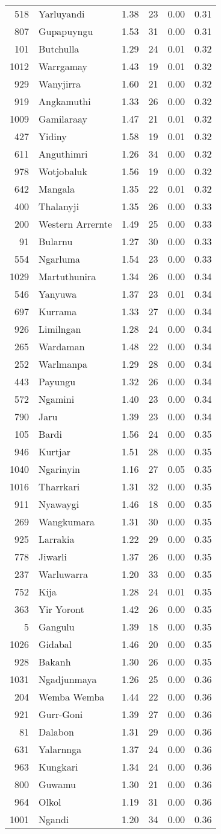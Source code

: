 \begin{longtable}[]{@{}rlrrrr@{}}
518 & Yarluyandi & 1.38 & 23 & 0.00 & 0.31\tabularnewline
807 & Gupapuyngu & 1.53 & 31 & 0.00 & 0.31\tabularnewline
101 & Butchulla & 1.29 & 24 & 0.01 & 0.32\tabularnewline
1012 & Warrgamay & 1.43 & 19 & 0.01 & 0.32\tabularnewline
929 & Wanyjirra & 1.60 & 21 & 0.00 & 0.32\tabularnewline
919 & Angkamuthi & 1.33 & 26 & 0.00 & 0.32\tabularnewline
1009 & Gamilaraay & 1.47 & 21 & 0.01 & 0.32\tabularnewline
427 & Yidiny & 1.58 & 19 & 0.01 & 0.32\tabularnewline
611 & Anguthimri & 1.26 & 34 & 0.00 & 0.32\tabularnewline
978 & Wotjobaluk & 1.56 & 19 & 0.00 & 0.32\tabularnewline
642 & Mangala & 1.35 & 22 & 0.01 & 0.32\tabularnewline
400 & Thalanyji & 1.35 & 26 & 0.00 & 0.33\tabularnewline
200 & Western Arrernte & 1.49 & 25 & 0.00 & 0.33\tabularnewline
91 & Bularnu & 1.27 & 30 & 0.00 & 0.33\tabularnewline
554 & Ngarluma & 1.54 & 23 & 0.00 & 0.33\tabularnewline
1029 & Martuthunira & 1.34 & 26 & 0.00 & 0.34\tabularnewline
546 & Yanyuwa & 1.37 & 23 & 0.01 & 0.34\tabularnewline
697 & Kurrama & 1.33 & 27 & 0.00 & 0.34\tabularnewline
926 & Limilngan & 1.28 & 24 & 0.00 & 0.34\tabularnewline
265 & Wardaman & 1.48 & 22 & 0.00 & 0.34\tabularnewline
252 & Warlmanpa & 1.29 & 28 & 0.00 & 0.34\tabularnewline
443 & Payungu & 1.32 & 26 & 0.00 & 0.34\tabularnewline
572 & Ngamini & 1.40 & 23 & 0.00 & 0.34\tabularnewline
790 & Jaru & 1.39 & 23 & 0.00 & 0.34\tabularnewline
105 & Bardi & 1.56 & 24 & 0.00 & 0.35\tabularnewline
946 & Kurtjar & 1.51 & 28 & 0.00 & 0.35\tabularnewline
1040 & Ngarinyin & 1.16 & 27 & 0.05 & 0.35\tabularnewline
1016 & Tharrkari & 1.31 & 32 & 0.00 & 0.35\tabularnewline
911 & Nyawaygi & 1.46 & 18 & 0.00 & 0.35\tabularnewline
269 & Wangkumara & 1.31 & 30 & 0.00 & 0.35\tabularnewline
925 & Larrakia & 1.22 & 29 & 0.00 & 0.35\tabularnewline
778 & Jiwarli & 1.37 & 26 & 0.00 & 0.35\tabularnewline
237 & Warluwarra & 1.20 & 33 & 0.00 & 0.35\tabularnewline
752 & Kija & 1.28 & 24 & 0.01 & 0.35\tabularnewline
363 & Yir Yoront & 1.42 & 26 & 0.00 & 0.35\tabularnewline
5 & Gangulu & 1.39 & 18 & 0.00 & 0.35\tabularnewline
1026 & Gidabal & 1.46 & 20 & 0.00 & 0.35\tabularnewline
928 & Bakanh & 1.30 & 26 & 0.00 & 0.35\tabularnewline
1031 & Ngadjunmaya & 1.26 & 25 & 0.00 & 0.36\tabularnewline
204 & Wemba Wemba & 1.44 & 22 & 0.00 & 0.36\tabularnewline
921 & Gurr-Goni & 1.39 & 27 & 0.00 & 0.36\tabularnewline
81 & Dalabon & 1.31 & 29 & 0.00 & 0.36\tabularnewline
631 & Yalarnnga & 1.37 & 24 & 0.00 & 0.36\tabularnewline
963 & Kungkari & 1.34 & 24 & 0.00 & 0.36\tabularnewline
800 & Guwamu & 1.30 & 21 & 0.00 & 0.36\tabularnewline
964 & Olkol & 1.19 & 31 & 0.00 & 0.36\tabularnewline
1001 & Ngandi & 1.20 & 34 & 0.00 & 0.36\tabularnewline

\end{longtable}
